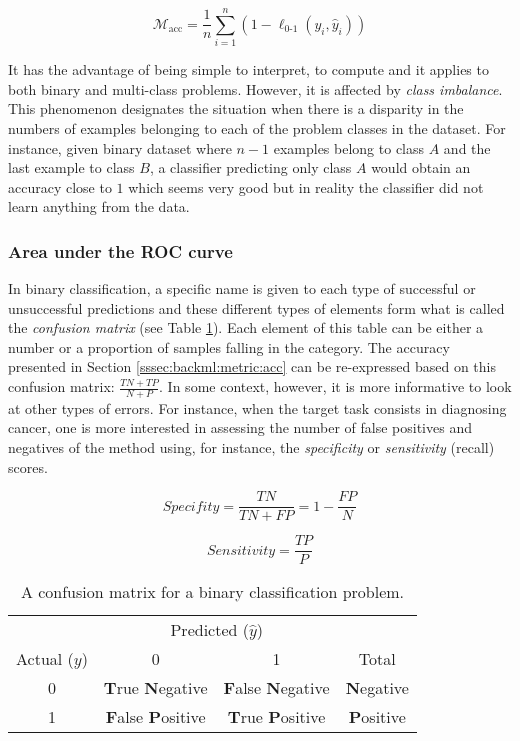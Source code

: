 \begin{equation}
\label{eqn:backml:accuracy}
\mathcal{M}_{\text{acc}} = \dfrac{1}{n} \sum\limits_{i = 1}^n (1 - \ell_{\text{0-1}}(y_i, \hat{y}_i))
\end{equation} 

It has the advantage of being simple to interpret, to compute and it applies to both binary and multi-class problems. However, it is affected by \textit{class imbalance}. This phenomenon designates the situation when there is a disparity in the numbers of examples belonging to each of the problem classes in the dataset. For instance, given binary dataset where $n-1$ examples belong to class $A$ and the last example to class $B$, a classifier predicting only class $A$ would obtain an accuracy close to $1$ which seems very good but in reality the classifier did not learn anything from the data.      

\subsubsection{Area under the ROC curve}
\label{sssec:backml:metric:rocauc}

In binary classification, a specific name is given to each type of successful or unsuccessful predictions and these different types of elements form what is called the \textit{confusion matrix} (see Table \ref{tab:backml:confusion}). Each element of this table can be either a number or a proportion of samples falling in the category. The accuracy presented in Section \ref{sssec:backml:metric:acc} can be re-expressed based on this confusion matrix: $\frac{TN + TP}{N + P}$. In some context, however, it is more informative to look at other types of errors. For instance, when the target task consists in diagnosing cancer, one is more interested in assessing the number of false positives and negatives of the method using, for instance, the \textit{specificity} or \textit{sensitivity} (\aka recall) scores.

\begin{equation}
\label{eqn:backml:specifity}
\textit{Specifity} = \frac{TN}{TN + FP} = 1 - \frac{FP}{N}
\end{equation}

\begin{equation}
\label{eqn:backml:sensitivity}
\textit{Sensitivity} = \frac{TP}{P}
\end{equation}

\begin{table}
  \centering
  \begin{tabular}{c|cc|c}
  & \multicolumn{2}{c}{Predicted ($\hat{y}$)} & \\
  Actual ($y$) & 0 & 1 & Total \\
  \hline
  0 & \textbf{T}rue \textbf{N}egative & \textbf{F}alse \textbf{N}egative & \textbf{N}egative \\
  1 & \textbf{F}alse \textbf{P}ositive & \textbf{T}rue \textbf{P}ositive & \textbf{P}ositive \\
  \end{tabular}
  \caption{A confusion matrix for a binary classification problem.}
  \label{tab:backml:confusion}
\end{table}

